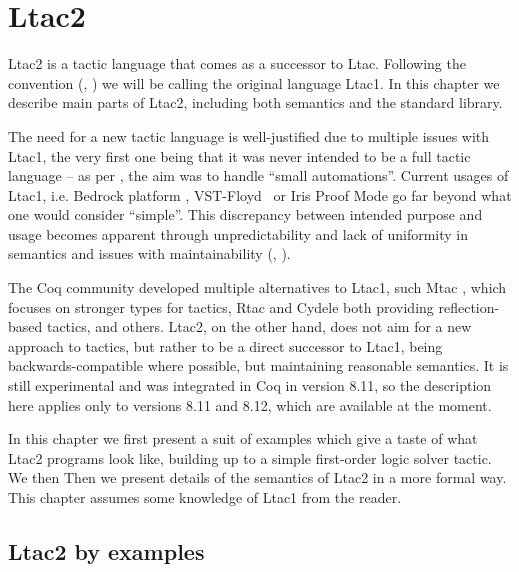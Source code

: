 \chapter{Ltac2}

Ltac2 is a tactic language that comes as a successor to Ltac.
Following the convention (\cite[Section 3.3.2]{thecoqdevelopmentteamCoqProofAssistant2020}, \cite{pedrotLtac2TacticalWarfare2019}) we will be calling the original language Ltac1.
In this chapter we describe main parts of Ltac2, including both semantics and the standard library.

The need for a new tactic language is well-justified due to multiple issues with Ltac1, the very first one being that it was never intended to be a full tactic language -- as per \citet{pedrotCoqHoTTminuteTickingClockwork2016}, the aim was to handle ``small automations''.
Current usages of Ltac1, i.e. Bedrock platform \cite{chlipalaMostlyautomatedVerificationLowlevel2011}, VST-Floyd~\cite{caoVSTFloydSeparationLogic2018} or Iris Proof Mode \cite{krebbersInteractiveProofsHigherorder2017, krebbersMoSeLGeneralExtensible2018} go far beyond what one would consider ``simple''.
This discrepancy between intended purpose and usage becomes apparent through unpredictability and lack of uniformity in semantics and issues with maintainability (\cite[Section 3.3.2]{thecoqdevelopmentteamCoqProofAssistant2020}, \cite{pedrotLtac2TacticalWarfare2019}).

The Coq community developed multiple alternatives to Ltac1, such Mtac \cite*{zilianiMtacMonadTyped2013, kaiserMtac2TypedTactics2018a}, which focuses on stronger types for tactics,
Rtac \cite{malechaExtensibleEfficientAutomation2016} and Cydele \cite{claretLightweightProofReflection2013} both providing reflection-based tactics, and others.
Ltac2, on the other hand, does not aim for a new approach to tactics, but rather to be a direct successor to Ltac1, being backwards-compatible where possible, but maintaining reasonable semantics.
It is still experimental and was integrated in Coq in version 8.11, so the description here applies only to versions 8.11 and 8.12, which are available at the moment.

In this chapter we first present a suit of examples which give a taste of what Ltac2 programs look like, building up to a simple first-order logic solver tactic.
We then Then we present details of the semantics of Ltac2 in a more formal way.
This chapter assumes some knowledge of Ltac1 from the reader.

\section{Ltac2 by examples}
\label{sec:ltac2-by-examples}

